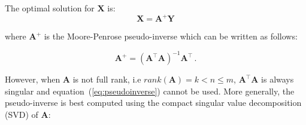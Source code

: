 The optimal solution for $\mathbf{\mathbf{X}}$ is:
\begin{equation}
\label{eq:MP}
\mathbf{\mathbf{X}}= \mathbf{A}^+ \mathbf{Y}
\end{equation}

\noindent where $\mathbf{A}^+$ is the Moore-Penrose pseudo-inverse
which can be written as follows: 

\begin{equation}
\label{eq:pseudoinverse}
\mathbf{A}^+= (\mathbf{A}^\top \mathbf{A})^{-1}\mathbf{A}^\top \, .
\end{equation}


%
%
%
%
%
%
%
%


However, when $\mathbf{A}$ is not full rank, i.e
$rank(\mathbf{A})=k <  n \leq m$, $\mathbf{A}^\top \mathbf{A}$ is
always singular and equation~(\ref{eq:pseudoinverse}) cannot be used.
More generally, the pseudo-inverse is best computed using the compact
singular value decomposition (SVD) of $\mathbf{A}$:

